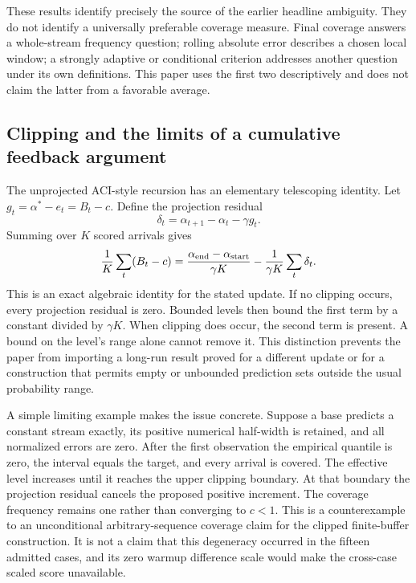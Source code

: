 These results identify precisely the source of the earlier headline ambiguity. They do not identify a universally preferable coverage measure. Final coverage answers a whole-stream frequency question; rolling absolute error describes a chosen local window; a strongly adaptive or conditional criterion addresses another question under its own definitions. This paper uses the first two descriptively and does not claim the latter from a favorable average.

\subsection{Clipping and the limits of a cumulative feedback argument}
The unprojected ACI-style recursion has an elementary telescoping identity. Let $g_t=\alpha^*-e_t=B_t-c$. Define the projection residual
\begin{equation}\label{eq:replay-projection}
 \delta_t=\alpha_{t+1}-\alpha_t-\gamma g_t.
\end{equation}
Summing over $K$ scored arrivals gives
\begin{equation}\label{eq:replay-telescope}
 \frac1K\sum_t(B_t-c)
 =\frac{\alpha_{\rm end}-\alpha_{\rm start}}{\gamma K}
  -\frac1{\gamma K}\sum_t\delta_t.
\end{equation}
This is an exact algebraic identity for the stated update. If no clipping occurs, every projection residual is zero. Bounded levels then bound the first term by a constant divided by $\gamma K$. When clipping does occur, the second term is present. A bound on the level's range alone cannot remove it. This distinction prevents the paper from importing a long-run result proved for a different update or for a construction that permits empty or unbounded prediction sets outside the usual probability range.

A simple limiting example makes the issue concrete. Suppose a base predicts a constant stream exactly, its positive numerical half-width is retained, and all normalized errors are zero. After the first observation the empirical quantile is zero, the interval equals the target, and every arrival is covered. The effective level increases until it reaches the upper clipping boundary. At that boundary the projection residual cancels the proposed positive increment. The coverage frequency remains one rather than converging to $c<1$. This is a counterexample to an unconditional arbitrary-sequence coverage claim for the clipped finite-buffer construction. It is not a claim that this degeneracy occurred in the fifteen admitted cases, and its zero warmup difference scale would make the cross-case scaled score unavailable.

